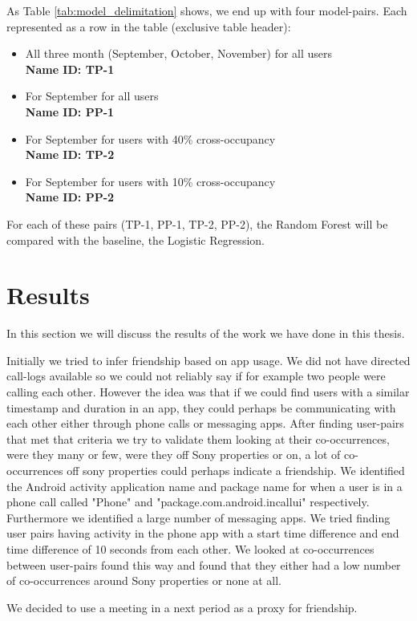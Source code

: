 As Table \ref{tab:model_delimitation} shows, we end up with four model-pairs. Each represented as a row in the table (exclusive table header): 
\begin{itemize}
\item All three month (September, October, November) for all users\\ \textbf{Name ID: TP-1}
\item For September for all users\\ \textbf{Name ID: PP-1}
\item For September for users with 40\% cross-occupancy\\ \textbf{Name ID: TP-2}
\item For September for users with 10\% cross-occupancy\\ \textbf{Name ID: PP-2}
\end{itemize}
For each of these pairs (TP-1, PP-1, TP-2, PP-2), the Random Forest will be compared with the baseline, the Logistic Regression. 
\section{Results}
In this section we will discuss the results of the work we have done in this thesis.

Initially we tried to infer friendship based on app usage. We did not have directed call-logs available so we could not reliably say if for example two people were calling each other. However the idea was that if we could find users with a similar timestamp and duration in an app, they could perhaps be communicating with each other either through phone calls or messaging apps. After finding user-pairs that met that criteria we try to validate them looking at their co-occurrences, were they many or few, were they off Sony properties or on, a lot of co-occurrences off sony properties could perhaps indicate a friendship. We identified the Android activity application name and package name for when a user is in a phone call called "Phone" and "package.com.android.incallui" respectively. Furthermore we identified a large number of messaging apps. We tried finding user pairs having activity in the phone app with a start time difference and end time difference of 10 seconds from each other. We looked at co-occurrences between user-pairs found this way and found that they either had a low number of co-occurrences around Sony properties or none at all.

We decided to use a meeting in a next period as a proxy for friendship.

